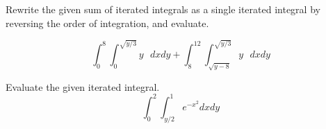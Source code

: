 \documentclass[11pt,letterpaper,boxed]{pset}
\begin{document}
    
    \begin{problem} [5.3.13]
    	Rewrite the given sum of iterated integrals as a single iterated integral by reversing the order of integration, and evaluate.
    
    	\[\int_{0}^{8} \int_{0}^{\sqrt{y/3}} y \textrm{ } dxdy +
    		\int_{8}^{12} \int_{\sqrt{y-8}}^{\sqrt{y/3}} y \textrm{ } dxdy \]
    \end{problem}
    \newpage
    
    
    \begin{problem} [5.3.18]
    	Evaluate the given iterated integral.
    	\[\int_{0}^{2} \int_{y/2}^{1} e^{-x^2} dxdy\]
    \end{problem}
    \newpage
    
\end{document}
